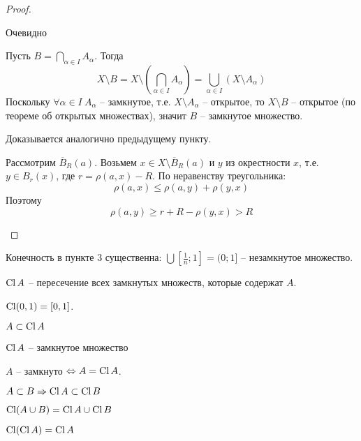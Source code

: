     \begin{proof}
        \begin{MyList}
            \item Очевидно
            \item Пусть $B = \bigcap_{\alpha \in I} A_\alpha$. Тогда
            \[X \setminus B = X \setminus \left(\bigcap_{\alpha \in I} A_\alpha\right) = \bigcup_{\alpha \in I} \left(X \setminus A_\alpha\right)\]
            Поскольку $\forall \alpha \in I \ A_\alpha$ -- замкнутое, т.е. $X \setminus A_\alpha$ -- открытое, то $X \setminus B$ -- открытое (по теореме об открытых множествах), значит $B$ -- замкнутое множество.
            \item Доказывается аналогично предыдущему пункту.
            \item Рассмотрим $\overline{B}_R(a)$. Возьмем $x \in X \setminus \overline{B}_R(a)$ и $y$ из окрестности $x$, т.е. $y \in B_r(x)$, где $r = \rho(a, x) - R$.
            По неравенству треугольника:
            \[\rho(a, x) \leqslant \rho(a, y) + \rho(y, x)\]
            Поэтому
            \[\rho (a, y) \geqslant r + R - \rho(y, x) > R\]
            \begin{figure}[H]
                \centering
                \def\svgwidth{.3\columnwidth}
                
            \end{figure}
        \end{MyList}
    \end{proof}

    \begin{Rem}
        Конечность в пункте 3 существенна: $\bigcup \left[\frac{1}{n}; 1\right] = (0; 1]$ -- незамкнутое множество.
    \end{Rem}

    \begin{notation}
        $\operatorname{Cl} A$ -- пересечение всех замкнутых множеств, которые содержат $A$. 
    \end{notation}

    \begin{Example}
        $\operatorname{Cl} (0, 1) = [0, 1]$. 
    \end{Example}

    \begin{Thm}[Свойства]
        \begin{MyList}
            \item $A \subset \operatorname{Cl} A$
            \item $\operatorname{Cl} A$ -- замкнутое множество
            \item $A$ -- замкнуто $\Leftrightarrow A = \operatorname{Cl} A$.
            \item $A \subset B \Rightarrow \operatorname{Cl} A \subset \operatorname{Cl} B$
            \item $\operatorname{Cl} (A \cup B) = \operatorname{Cl} A \cup \operatorname{Cl} B$
            \item $\operatorname{Cl} (\operatorname{Cl} A) = \operatorname{Cl} A$      
        \end{MyList}
    \end{Thm}

